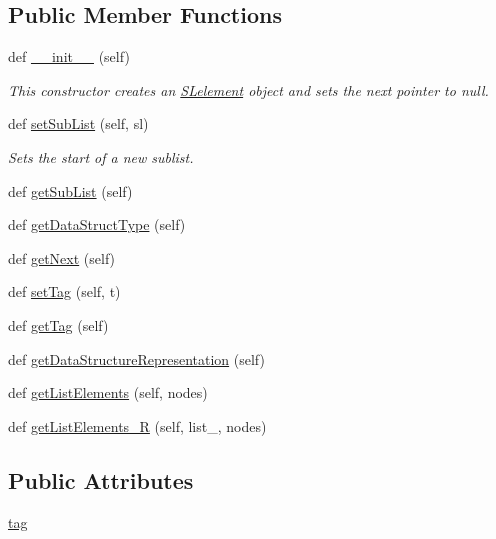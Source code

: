 \subsection*{Public Member Functions}
\begin{DoxyCompactItemize}
\item 
def \hyperlink{class_m_lelement_1_1_m_lelement_a766cf6410bcce3cf8f4f9dd6a671c7f5}{\+\_\+\+\_\+init\+\_\+\+\_\+} (self)
\begin{DoxyCompactList}\small\item\em This constructor creates an \hyperlink{namespace_s_lelement}{S\+Lelement} object and sets the next pointer to null. \end{DoxyCompactList}\item 
def \hyperlink{class_m_lelement_1_1_m_lelement_a6cbd06fbe5d77837a736c035601d4d60}{set\+Sub\+List} (self, sl)
\begin{DoxyCompactList}\small\item\em Sets the start of a new sublist. \end{DoxyCompactList}\item 
def \hyperlink{class_m_lelement_1_1_m_lelement_a9372242ef8c51e4ab6f792e90a1eeab4}{get\+Sub\+List} (self)
\item 
def \hyperlink{class_m_lelement_1_1_m_lelement_a50e032338abeb140c1bc4b108a3070b9}{get\+Data\+Struct\+Type} (self)
\item 
def \hyperlink{class_m_lelement_1_1_m_lelement_af9b63925595587439f941da816b59e49}{get\+Next} (self)
\item 
def \hyperlink{class_m_lelement_1_1_m_lelement_a76d2c74303e1d8d33adb4670aafaf0de}{set\+Tag} (self, t)
\item 
def \hyperlink{class_m_lelement_1_1_m_lelement_a8c1b0ffc862b9aa99e6ac801e799a554}{get\+Tag} (self)
\item 
def \hyperlink{class_m_lelement_1_1_m_lelement_ad1856535489fc39dbaf8539f88ff6e45}{get\+Data\+Structure\+Representation} (self)
\item 
def \hyperlink{class_m_lelement_1_1_m_lelement_a71b7855b0790079c585465d013508d45}{get\+List\+Elements} (self, nodes)
\item 
def \hyperlink{class_m_lelement_1_1_m_lelement_ae189cb2ff22dbd868ff104647852d8c1}{get\+List\+Elements\+\_\+R} (self, list\+\_\+, nodes)
\end{DoxyCompactItemize}
\subsection*{Public Attributes}
\begin{DoxyCompactItemize}
\item 
\hyperlink{class_m_lelement_1_1_m_lelement_ae7e3455395f34a27e1a7e8fa26adce50}{tag}
\end{DoxyCompactItemize}
